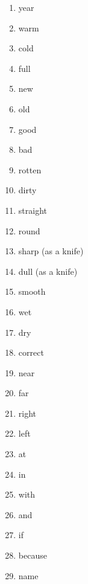 \begin{multicols}{2}
\begin{enumerate}
\item   year 

\item   warm 

\item   cold 

\item   full 

\item   new 

\item   old 

\item   good 

\item   bad 

\item   rotten 

\item   dirty 

\item   straight 

\item   round 

\item   sharp (as a knife) 

\item   dull (as a knife) 

\item   smooth 

\item   wet 

\item   dry 

\item   correct 

\item   near 

\item   far 

\item   right 

\item   left 

\item   at 

\item   in 

\item   with 

\item   and 

\item   if 

\item   because 

\item   name 
\end{enumerate}
\end{multicols}



